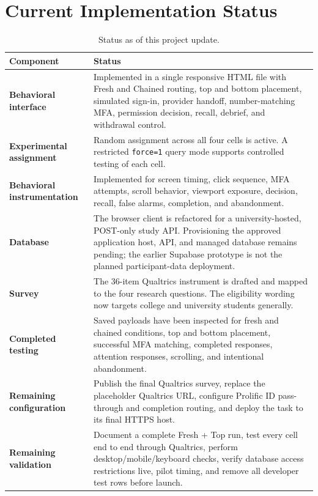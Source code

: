 \documentclass[11pt]{article}
\begin{document}
\section{Current Implementation Status}

\begin{table}[ht]
\centering
\caption{Status as of this project update.}
\begin{tabularx}{\textwidth}{>{\bfseries}p{} X}
\toprule
Component & Status \\
\midrule
Behavioral interface &
Implemented in a single responsive HTML file with Fresh and Chained routing,
top and bottom placement, simulated sign-in, provider handoff, number-matching
MFA, permission decision, recall, debrief, and withdrawal control. \\

Experimental assignment &
Random assignment across all four cells is active. A restricted
\texttt{force=1} query mode supports controlled testing of each cell. \\

Behavioral instrumentation &
Implemented for screen timing, click sequence, MFA attempts, scroll behavior,
viewport exposure, decision, recall, false alarms, completion, and
abandonment. \\

Database &
The browser client is refactored for a university-hosted, POST-only study API.
Provisioning the approved application host, API, and managed database remains
pending; the earlier Supabase prototype is not the planned participant-data
deployment. \\

Survey &
The 36-item Qualtrics instrument is drafted and mapped to the four research
questions. The eligibility wording now targets college and university
students generally. \\

Completed testing &
Saved payloads have been inspected for fresh and chained conditions, top and
bottom placement, successful MFA matching, completed responses, attention
responses, scrolling, and intentional abandonment. \\

Remaining configuration &
Publish the final Qualtrics survey, replace the placeholder Qualtrics URL,
configure Prolific ID pass-through and completion routing, and deploy the task
to its final HTTPS host. \\

Remaining validation &
Document a complete Fresh + Top run, test every cell end to end through
Qualtrics, perform desktop/mobile/keyboard checks, verify database access
restrictions live, pilot timing, and remove all developer test rows before
launch. \\
\bottomrule
\end{tabularx}
\end{table}
\end{document}

